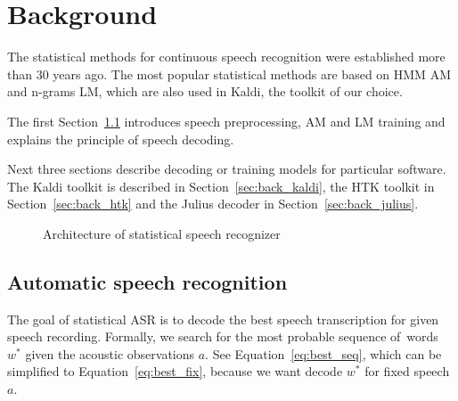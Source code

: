 \chapter{Background}
\label{cha:background}

% 
% 

The statistical methods for continuous speech recognition were established more than 30 years ago. 
The most popular statistical methods are based on \ac{HMM} \acl{AM} and n-grams \ac{LM},
which are also used in Kaldi, the toolkit of our choice.

The first Section~\ref{sec:back_asr} introduces speech preprocessing, \ac{AM} and \ac{LM} training
and explains the principle of speech decoding.

Next three sections describe decoding or training models for particular software.
The Kaldi toolkit is described in Section~\ref{sec:back_kaldi}, 
the \ac{HTK} toolkit in Section~\ref{sec:back_htk} and 
the Julius decoder in Section~\ref{sec:back_julius}.

\begin{figure}[!htp]
    \begin{center}
    
    \caption{Architecture of statistical speech recognizer\cite{ney1990acoustic}}
    \label{fig:components} 
    \end{center}
\end{figure}

\section{Automatic speech recognition}
\label{sec:back_asr}

The goal of statistical \ac{ASR} is to decode 
the best speech transcription for given speech recording.
Formally, we search for the most probable sequence of~words $w^*$ given the acoustic observations $a$.
See Equation~\ref{eq:best_seq}, which can be simplified to Equation~\ref{eq:best_fix},
because we want decode $w^*$ for fixed speech $a$.

